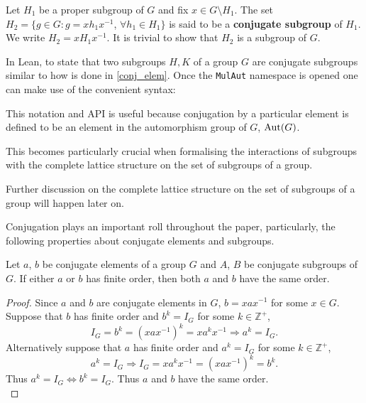 \begin{definition}
Let $H_1$ be a proper subgroup of $G$ and fix $x \in G \setminus H_1$. The set $H_2 = \{g \in G : g= xh_1x^{-1}$, $\forall h_1 \in H_1\}$ is said to be a \textbf{conjugate subgroup} of $H_1$. We write $H_2 = xH_1x^{-1}$. It is trivial to show that $H_2$ is a subgroup of $G$.
\end{definition}

\begin{remark}
In Lean, to state that two subgroups $H, K$ of a group $G$ are conjugate subgroups similar to how is done 
in \ref{conj_elem}. Once the \texttt{MulAut} namespace is opened one can make use of the convenient syntax:


This notation and API is useful because conjugation by a particular element is defined to be an element in the automorphism group of $G$, $\operatorname{Aut}(G)$. 

This becomes particularly crucial when formalising the interactions of subgroups with the complete lattice structure on the set of subgroups of a group. 

Further discussion on the complete lattice structure on the set of subgroups of a group will happen later on.
\end{remark}

Conjugation plays an important roll throughout the paper, 
particularly, the following properties about conjugate elements and subgroups.

\begin{proposition}
    \label{orderOf_injective}
Let $a$, $b$ be conjugate elements of a group $G$ and $A$, $B$ be conjugate subgroups of $G$.
If either $a$ or $b$ has finite order, then both $a$ and $b$ have the same order.
\end{proposition}

\begin{proof}
    Since $a$ and $b$ are conjugate elements in $G$, $b = xax^{-1}$ for some $x \in G$. Suppose that $b$ has finite order and $b^k = I_G$ for some $k \in \mathbb{Z}^+$,
    \begin{equation*} 
        I_G = b^k = (xax^{-1})^k = xa^{k}x^{-1} \Rightarrow a^k = I_G.
    \end{equation*}
    Alternatively suppose that $a$ has finite order and $a^k = I_G$ for some $k \in \mathbb{Z}^+$,
    \begin{equation*} 
        a^k = I_G \Rightarrow I_G = xa^{k}x^{-1} = (xax^{-1})^k = b^k.
    \end{equation*}
    Thus $a^k = I_G \iff b^k = I_G$. Thus $a$ and $b$ have the same order. \\
\end{proof}

